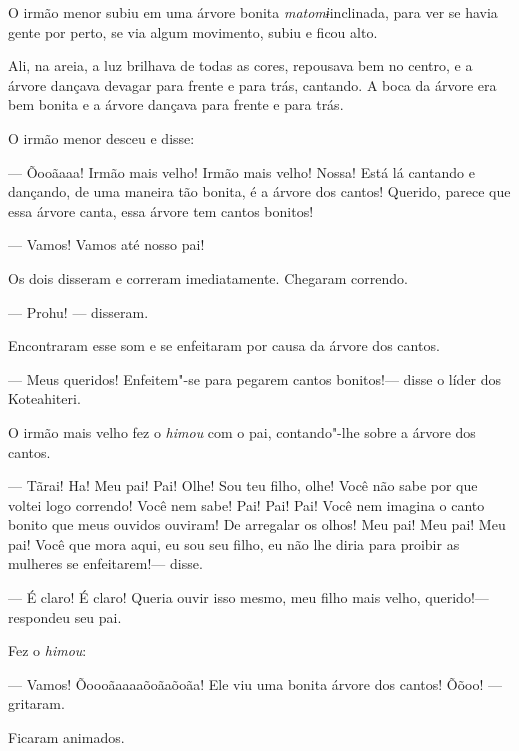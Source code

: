 O irmão menor subiu em uma árvore bonita \emph{matomɨ}inclinada, para
ver se havia gente por perto, se via algum movimento, subiu e ficou
alto. 

Ali, na areia, a luz brilhava de todas as cores, repousava bem no
centro, e a árvore dançava devagar para frente e para trás, cantando. A boca da árvore era bem bonita e a árvore dançava para frente e para
trás. 

O irmão menor desceu e disse:

--- Õooãaaa! Irmão mais velho! Irmão mais velho! Nossa! Está lá cantando
e dançando, de uma maneira tão bonita, é a árvore dos cantos! Querido,
parece que essa árvore canta, essa árvore tem cantos bonitos! 

--- Vamos! Vamos até nosso pai! 

Os dois disseram e correram imediatamente. Chegaram correndo.

--- Prohu! --- disseram. 

Encontraram esse som e se enfeitaram por causa da árvore dos cantos. 

--- Meus queridos! Enfeitem"-se para pegarem cantos bonitos!--- disse o
líder dos Koteahiteri. 

O irmão mais velho fez o \emph{himou} com o pai, contando"-lhe sobre a
árvore dos cantos. 

--- Tãrai! Ha! Meu pai! Pai! Olhe! Sou teu filho, olhe! Você não sabe
por que voltei logo correndo! Você nem sabe! Pai! Pai! Pai! Você nem
imagina o canto bonito que meus ouvidos ouviram! De arregalar os olhos!
Meu pai! Meu pai! Meu pai! Você que mora aqui, eu sou seu filho, eu não
lhe diria para proibir as mulheres se enfeitarem!--- disse. 

--- É claro! É claro! Queria ouvir isso mesmo, meu filho mais velho,
querido!--- respondeu seu pai. 

Fez o \emph{himou}: 

--- Vamos! Õoooãaaaaõoãaõoãa! Ele viu uma bonita árvore dos cantos!
Õõoo! --- gritaram. 

Ficaram animados.

 

